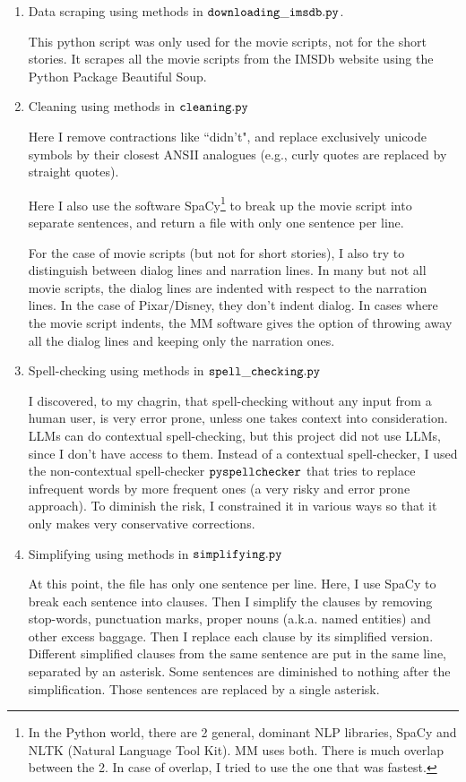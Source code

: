 \documentclass[12pt]{article}
\begin{document}
\begin{enumerate}
\item Data scraping using methods in $\tt downloading\_imsdb.py$.

This python script was only used for the movie
scripts, not for the short stories. It 
scrapes all the movie scripts from the IMSDb
website using the Python Package Beautiful Soup.

\item Cleaning using methods in $\tt cleaning.py$

Here I remove contractions like ``didn't",
and replace exclusively unicode symbols 
by their closest ANSII analogues (e.g.,
curly quotes are replaced by straight quotes).

Here I also use the software SpaCy\footnote{In the Python
world, there are 2 general, dominant
NLP libraries, SpaCy and NLTK (Natural Language Tool Kit). MM uses both. There is much overlap
between the 2. In case of overlap, I tried to use the one that was fastest.} to break up the movie script into 
separate sentences, and return a file with only
one sentence per line.

For the case of movie scripts (but not for short 
stories), I also try to distinguish between 
dialog lines and narration lines.
In many but not all movie scripts, the dialog lines are indented with 
respect to the narration lines.
In the case of Pixar/Disney, they don't indent dialog. In cases where the movie script indents,
the MM software gives the option of throwing away all the dialog lines and keeping only the narration
ones.



\item Spell-checking using methods in $\tt spell\_checking.py$

I discovered, to my chagrin, that spell-checking
without any input from a human user,
is very error prone, unless one takes context into consideration. LLMs can do contextual spell-checking, but this project did not use LLMs,
since I don't have access to them.
Instead of a contextual spell-checker,
I used the non-contextual
spell-checker $\tt pyspellchecker$
that tries to replace infrequent words by
more frequent ones (a very risky
and error prone approach). To 
diminish the risk, I
 constrained it in various ways so
that it only makes very conservative corrections.

\item Simplifying using methods in $\tt simplifying.py$

At this point, the file
has only one
sentence per line.
Here, I  use SpaCy to
break each sentence into clauses.
Then I simplify the clauses by removing
stop-words, punctuation marks, proper nouns (a.k.a. named entities) and other excess baggage.
Then I replace each clause by its simplified version.
Different simplified clauses from the same sentence
are put in the same line, separated by an asterisk.
Some sentences are diminished to nothing after
the simplification.
Those sentences are replaced by a single asterisk.


\end{enumerate}
\end{document}
